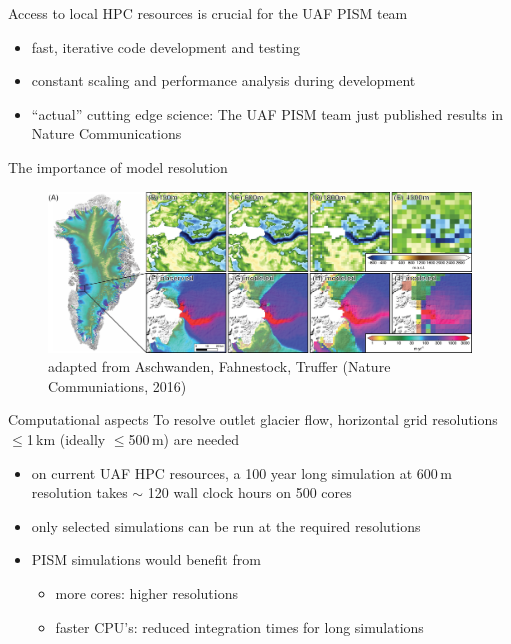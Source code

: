\documentclass[hide notes,intlimits]{beamer}
\begin{document}
\begin{frame}{}
  \begin{block}{Access to local HPC resources is crucial for the UAF PISM team}
    \begin{itemize}
    \item fast, iterative code development and testing
    \item constant scaling and performance analysis during development
    \item ``actual'' cutting edge science: The UAF PISM team just published results in Nature Communications
    \end{itemize}
  \end{block}
\end{frame}



\begin{frame}{The importance of model resolution}
  \begin{figure}
    \includegraphics[width=\textwidth]{jakobshavn-beds}
    \\ \small adapted from Aschwanden, Fahnestock, Truffer (Nature Communiations, 2016)
  \end{figure}
\end{frame}


\begin{frame}{Computational aspects}
  To resolve outlet glacier flow, horizontal grid resolutions $\le$1\,km (ideally $\le$500\,m) are needed
  \begin{itemize}
  \item on current UAF HPC resources, a 100 year long simulation at 600\,m resolution takes $\sim$ 120 wall clock hours on 500 cores
  \item only selected simulations can be run at the required resolutions
  \item PISM simulations would benefit from
    \begin{itemize}
    \item more cores: higher resolutions
  \item faster CPU's: reduced integration times for long simulations
  \end{itemize}
\end{itemize}
\end{frame}
\end{document}
